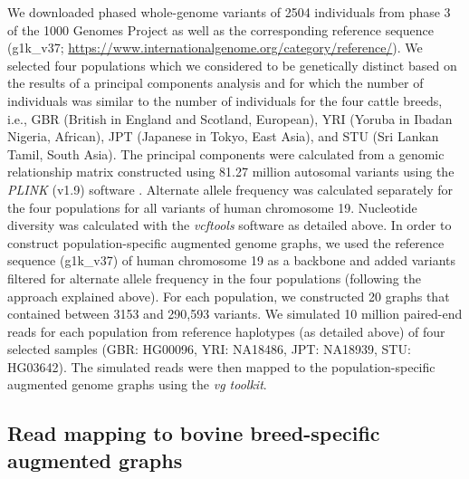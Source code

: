 \documentclass[../main.tex]{subfiles}
\begin{document}
We downloaded phased whole-genome variants of 2504 individuals from phase 3 of the 1000 Genomes Project \citep{10002015global} as well as the corresponding reference sequence (g1k\_v37; \url{https://www.internationalgenome.org/category/reference/}). We selected four populations which we considered to be genetically distinct based on the results of a principal components analysis and for which the number of individuals was similar to the number of individuals for the four cattle breeds, i.e., GBR (British in England and Scotland, European), YRI (Yoruba in Ibadan Nigeria, African), JPT (Japanese in Tokyo, East Asia), and STU (Sri Lankan Tamil, South Asia). The principal components were calculated from a genomic relationship matrix constructed using 81.27 million autosomal variants using the \emph{PLINK} (v1.9) software \citep{chang2015second}. Alternate allele frequency was calculated separately for the four populations for all variants of human chromosome 19. Nucleotide diversity was calculated with the \emph{vcftools} software as detailed above. In order to construct population-specific augmented genome graphs, we used the reference sequence (g1k\_v37) of human chromosome 19 as a backbone and added variants filtered for alternate allele frequency in the four populations (following the approach explained above). For each population, we constructed 20 graphs that contained between 3153 and 290,593 variants. We simulated 10 million paired-end reads for each population from reference haplotypes (as detailed above) of four selected samples (GBR: HG00096, YRI: NA18486, JPT: NA18939, STU: HG03642). The simulated reads were then mapped to the population-specific augmented genome graphs using the \emph{vg toolkit}.

\subsection*{Read mapping to bovine breed-specific augmented graphs}
\end{document}
